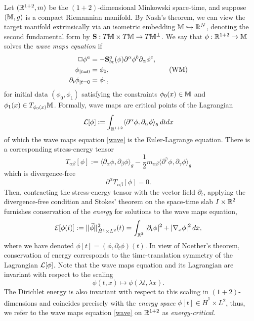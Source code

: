 Let $(\mathbb R^{1 + 2}, m)$ be the $(1 + 2)$-dimensional Minkowski space-time, and suppose $(\mathbb M, g)$ is a compact Riemannian manifold. By Nash's theorem, we can view the target manifold extrinsically via an isometric embedding $\mathbb M \hookrightarrow \mathbb R^N$, denoting the second fundamental form by ${\bf S}  : T\mathbb M \times T\mathbb M \to T \mathbb M^\perp$. We say that $\phi : \mathbb R^{1 + 2} \to \mathbb M$ solves the \emph{wave maps equation} if 
\begin{equation}
	\begin{split}
		\Box \phi^a 
			&= - {\bf S} ^a_{bc} (\phi)  \partial^\alpha \phi^b \partial_\alpha \phi^c, \\
		\phi_{|t = 0}
			&= \phi_0 ,\\
		\partial_t \phi_{|t = 0}
			&= \phi_1,	
	\end{split}
	\label{eq:wave}
	\tag{WM}
\end{equation}
for initial data $(\phi_0, \phi_1)$ satisfying the constraints $\phi_0 (x) \in \mathbb M$ and $\phi_1 (x) \in T_{\phi_0 (x)} \mathbb M$. Formally, wave maps are critical points of the Lagrangian
	\[ \mathcal L [\phi] := \int_{\mathbb R^{1 + 2}} \langle\partial^\alpha \phi, \partial_\alpha \phi \rangle_g \, dt dx \]
of which the wave maps equation \eqref{wave} is the Euler-Lagrange equation. There is a corresponding stress-energy tensor 
	\[ 
		T_{\alpha\beta} [\phi] := \langle \partial_\alpha \phi, \partial_\beta \phi \rangle_g  - \frac12 m_{\alpha \beta} \langle \partial^\gamma \phi, \partial_\gamma \phi \rangle_g
	 \]
which is divergence-free
	\[ \partial^\alpha T_{\alpha \beta} [\phi] = 0. \]
Then, contracting the stress-energy tensor with the vector field $\partial_t$, applying the divergence-free condition and Stokes' theorem on the space-time slab $I \times \mathbb R^2$ furnishes conservation of the \emph{energy} for solutions to the wave maps equation, 
	\[ \mathcal E[\phi (t)] := ||\vec \phi||_{\dot H^1 \times L^2}^2 (t) = \int_{\mathbb R^2} |\partial_t \phi|^2 + |\nabla_x \phi|^2 \, dx , \]
where we have denoted $\phi[t]= (\phi, \partial_t \phi) (t)$. In view of Noether's theorem, conservation of energy corresponds to the time-translation symmetry of the Lagrangian $\mathcal L [\phi]$. Note that the wave maps equation and its Lagrangian are invariant with respect to the scaling 
	\[ \phi(t, x) \mapsto \phi(\lambda t, \lambda x). \]
The Dirichlet energy is also invariant with respect to this scaling in $(1 + 2)$-dimensions and coincides precisely with the \emph{energy space} $\phi [t] \in \dot H^1 \times L^2$, thus, we refer to the wave maps equation \eqref{wave} on $\mathbb R^{1 + 2}$ as \emph{energy-critical}. 

